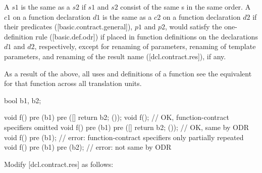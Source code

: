 \begin{adjustwidth}{0.5cm}{0.5cm}
A  $s1$ is the same as a  $s2$ if $s1$ and $s2$ consist of the same s in the same order. A  $c1$ on a function declaration $d1$ is the same as a 
$c2$ on a function declaration $d2$ if their predicates ([basic.contract.general]), $p1$ and $p2$,
would satisfy the one-definition rule ([basic.def.odr]) if placed in function definitions on
the declarations $d1$ and $d2$, respectively, except for renaming of parameters, renaming of
template parameters, and renaming of the result name ([dcl.contract.res]), if any.
\begin{note}
As a result of the above, all uses and definitions of a function see the equivalent
 for that function across all translation units.
\end{note}
\begin{addedblock}
\begin{example}
\begin{codeblock}
bool b1, b2;

void f() pre (b1) pre ([]{ return b2; }());
void f();                    // OK, function-contract specifiers omitted
void f() pre (b1) pre ([]{ return b2; }());  // OK, same by ODR
void f() pre (b1);           // error: function-contract specifiers only partially repeated
void f() pre (b1) pre (b2);  // error: not same by ODR
\end{codeblock}
\end{example}
\end{addedblock}
\end{adjustwidth}

Modify [dcl.contract.res] as follows:

